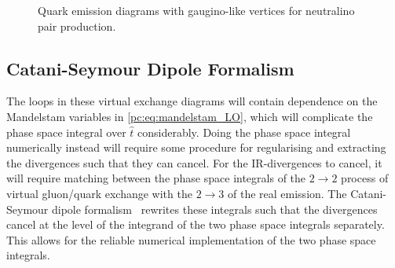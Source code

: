 \documentclass[../main.tex]{subfiles}
\begin{document}
\begin{figure}[ht!]
  \centering
  \begin{subfigure}{0.32\textwidth}
    \centering
    \caption{}
  \end{subfigure}
  \begin{subfigure}{0.32\textwidth}
    \centering
    \caption{}
  \end{subfigure}
  \begin{subfigure}{0.32\textwidth}
    \centering
    \caption{}
  \end{subfigure}
  \begin{subfigure}{0.32\textwidth}
    \centering
    \caption{}
  \end{subfigure}
  \begin{subfigure}{0.32\textwidth}
    \centering
    \caption{}
  \end{subfigure}
  \begin{subfigure}{0.32\textwidth}
    \centering
    \caption{}
  \end{subfigure}
  \caption{Quark emission diagrams with gaugino-like vertices for neutralino pair production.}
  \label{pc:fig:tu_quark_emission}
\end{figure}


\subsection{Catani-Seymour Dipole Formalism}
The loops in these virtual exchange diagrams will contain dependence on the Mandelstam variables in \cref{pc:eq:mandelstam_LO}, which will complicate the phase space integral over \(\hat{t}\) considerably.
Doing the phase space integral numerically instead will require some procedure for regularising and extracting the divergences such that they can cancel.
For the IR-divergences to cancel, it will require matching between the phase space integrals of the \(2 \to 2\) process of virtual gluon/quark exchange with the \(2 \to 3\) of the real emission.
The Catani-Seymour dipole formalism~\cite{Catani:1996vz} rewrites these integrals such that the divergences cancel at the level of the integrand of the two phase space integrals separately.
This allows for the reliable numerical implementation of the two phase space integrals.
\end{document}
